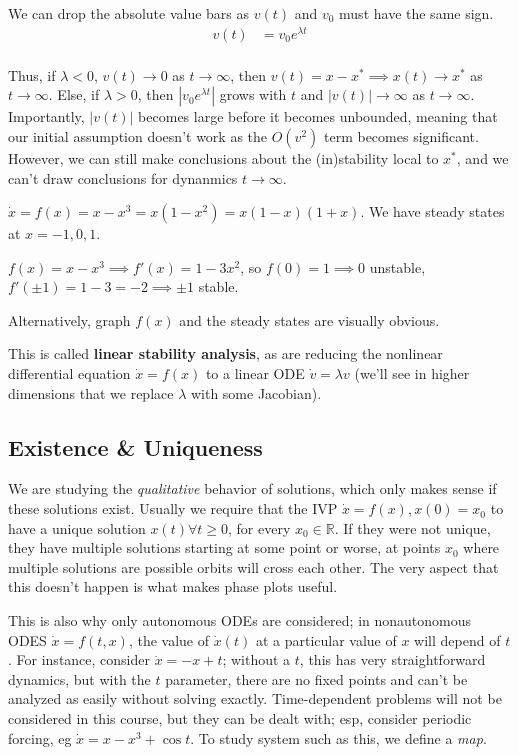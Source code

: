 \documentclass[12pt, oneside]{article}
\begin{document}
We can drop the absolute value bars as $v(t)$ and $v_0$ must have the same sign.
\begin{align*}
  v(t) &= v_0 e^{\lambda t}\\
\end{align*}

Thus, if $\lambda < 0$, $v(t) \to 0$ as $t \to \infty$, then $v(t) = x - x^* \implies x(t) \to x^*$ as $t \to \infty$. Else, if $\lambda > 0$, then $|v_0 e^{\lambda t}|$ grows with $t$ and $|v(t)| \to \infty$ as $t \to \infty$. Importantly, $|v(t)|$ becomes large before it becomes unbounded, meaning that our initial assumption doesn't work as the $O(v^2)$ term becomes significant. However, we can still make conclusions about the (in)stability local to $x^*$, and we can't draw conclusions for dynanmics $t \to \infty$.

\begin{example}
  $\dot{x} = f(x) = x-x^3 = x(1-x^2) = x(1-x)(1+x)$. We have steady states at $x = -1,0,1$.

  $f(x) = x - x^3 \implies f'(x) = 1 - 3x^2$, so $f(0) = 1 \implies 0$ unstable, $f'(\pm 1) = 1 -3 = -2 \implies \pm 1$ stable.

  Alternatively, graph $f(x)$ and the steady states are visually obvious.
\end{example}

This is called \textbf{linear stability analysis}, as are reducing the nonlinear differential equation $\dot{x} = f(x)$ to a linear ODE $\dot{v} = \lambda v$ (we'll see in higher dimensions that we replace $\lambda$ with some Jacobian).

\subsection{Existence \& Uniqueness}

We are studying the \textit{qualitative} behavior of solutions, which only makes sense if these solutions exist. Usually we require that the IVP $\dot{x} = f(x), x(0) = x_0$ to have a unique solution $x(t) \forall t \geq 0$, for every $x_0 \in \mathbb{R}$. If they were not unique, they have multiple solutions starting at some point or worse, at points $x_0$ where multiple solutions are possible orbits will cross each other. The very aspect that this doesn't happen is what makes phase plots useful.

This is also why only autonomous ODEs are considered; in nonautonomous ODES $\dot{x} = f(t,x)$, the value of $\dot{x}(t)$ at a particular value of $x$ will depend of $t$. For instance, consider $\dot{x} = -x+t$; without a $t$, this has very straightforward dynamics, but with the $t$ parameter, there are no fixed points and can't be analyzed as easily without solving exactly. Time-dependent problems will not be considered in this course, but they can be dealt with; esp, consider periodic forcing, eg $\dot{x} = x - x^3 + \cos t$. To study system such as this, we define a \textit{map}.
\end{document}
